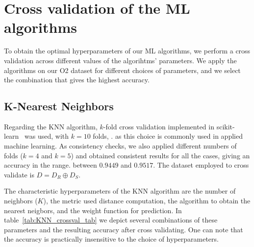 \appendix

\section{Cross validation of the ML algorithms}  \label{app:crossval}

To obtain the optimal hyperparameters of our \ac{ML} algorithms, we perform a cross validation across different values of the algorihtms' parameters. We apply the algorithms on our O2 dataset for different choices of parameters, and we select the combination that gives the highest accuracy. 

\subsection{K-Nearest Neighbors}

Regarding the \ac{KNN} algorithm, $k$-fold cross validation implemented in scikit-learn~\cite{Pedregosa:2011ork} was used, with $k = 10$ folds, . as this choice is commonly used in applied machine learning. As consistency checks, we also applied different numbers of folds ($k = 4$ and $k=5$) and obtained consistent results for all the cases, giving an accuracy in the range. between $0.9449$ and $0.9517$.  The dataset employed to cross validate is $D=D_R\oplus D_S$. 

The characteristic hyperparameters of the \ac{KNN} algorithm are the number of neighbors ($K$), the metric used distance computation, the algorithm to obtain the nearest neigbors, and the weight function for prediction. In table~\ref{tab:KNN_crossval_tab} we depict several combinations of these parameters and the resulting accuracy after cross validating. One can note that the accuracy is practically insensitive to the choice of hyperparameters.


